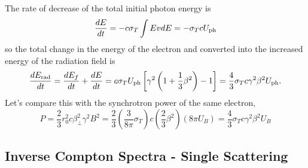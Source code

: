 The rate of decrease of the total initial photon energy is
\begin{equation}
\frac{d {E}}{d {t}} = -c\sigma_T \int E v dE = -\sigma_T c U_{\hbox{\rm \scriptsize ph}}
\label{eq:416}
\end{equation}
so the total change in the energy of the electron and converted into
the increased energy of the radiation field is
\begin{equation}
\frac{d {E_{\hbox{\rm \scriptsize rad}}}}{d {t}} = \frac{d {E_f}}{d {t}} + \frac{d {E}}{d {t}} = c\sigma_T
U_{\hbox{\rm \scriptsize ph}} \left [ \gamma^2 \left ( 1 + \frac{1}{3} \beta^2 \right )
  - 1 \right ] = \frac{4}{3} \sigma_T c \gamma^2 \beta^2 U_{\hbox{\rm \scriptsize ph}}.
\label{eq:417}
\end{equation}
Let's compare this with the synchrotron power of the same electron,
\begin{equation}
P = 
\frac{2}{3} r_0^2 c \beta^2_\perp \gamma^2 B^2 = \frac{2}{3}
\left ( \frac{3}{8\pi} \sigma_T \right ) c \left ( \frac{2}{3} \beta^2
\right ) \left ( 8\pi U_B \right ) = \frac{4}{3} \sigma_T c \gamma^2 \beta^2
 U_B 
\label{eq:418}
\end{equation}
\subsection{Inverse Compton Spectra - Single Scattering}
\label{sec:inverse-compt-spectr}

